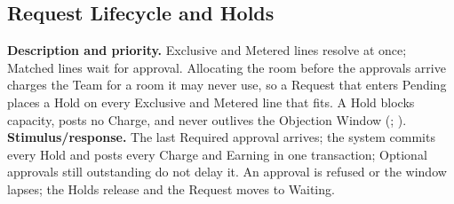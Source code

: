 \subsection{Request Lifecycle and Holds}\label{feat:lifecycle}
\textbf{Description and priority.} Exclusive and Metered lines resolve at once; Matched lines wait for approval. Allocating the room before the approvals arrive charges the Team for a room it may never use, so a Request that enters Pending places a Hold on every Exclusive and Metered line that fits. A Hold blocks capacity, posts no Charge, and never outlives the Objection Window (; ).  \textbf{Stimulus/response.} The last Required approval arrives; the system commits every Hold and posts every Charge and Earning in one transaction; Optional approvals still outstanding do not delay it. An approval is refused or the window lapses; the Holds release and the Request moves to Waiting.

